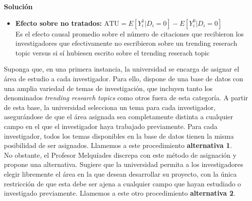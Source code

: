 \documentclass[a4paper, answers, addpoints, 11pt]{exam}
\newenvironment{solucion}{%
  \begin{mdframed}[
    backgroundcolor=blue!5,    %
    linecolor=blue!50,          %
    linewidth=2pt,              %
    leftmargin=10pt,            %
    rightmargin=10pt,           %
    topline=true,              %
    bottomline=true,            %
    roundcorner=10pt,           %
    innerleftmargin=10pt,       %
    innerrightmargin=10pt,      %
    innerbottommargin=10pt,     %
    innertopmargin=10pt         %
  ]%
  \begin{tcolorbox}[colframe=blue!50!black, colback=blue!50, coltitle=white, sharp corners=all, boxrule=1mm, width=\textwidth, halign=left, valign=center, top=0mm, bottom=0mm, left=0mm, right=0mm] \textbf{Solución} \end{tcolorbox} }{\end{mdframed}}
\begin{document}
\begin{itemize}
\begin{itemize}
\begin{solucion}
\begin{itemize}
    \item \textbf{Efecto sobre no tratados:} \( \text{ATU} = E[Y_i^1 | D_i = 0] - E[Y_i^0 | D_i = 0] \)\\
          Es el efecto causal promedio sobre el número de citaciones que recibieron los investigadores que efectivamente no escribieron sobre un trending reserach topic versus  si sí hubiesen escrito sobre el trending reserach topic 
\end{itemize}

        \end{solucion}
    \end{itemize}

\end{itemize}
\bigskip

Suponga que, en una primera instancia, la universidad se encarga de asignar el área de estudio a cada investigador. Para ello, dispone de una base de datos con una amplia variedad de temas de investigación, que incluyen tanto los denominados \textit{trending research topics} como otros fuera de esta categoría. A partir de esta base, la universidad selecciona un tema para cada investigador, asegurándose de que el área asignada sea completamente distinta a cualquier campo en el que el investigador haya trabajado previamente. Para cada investigador, todos los temas disponibles en la base de datos tienen la misma posibilidad de ser asignados. Llamemos a este procedimiento \textbf{alternativa 1}. \\

No obstante, el Profesor Melquíades discrepa con este método de asignación y propone una alternativa. Sugiere que la universidad permita a los investigadores elegir libremente el área en la que desean desarrollar su proyecto, con la única restricción de que esta debe ser ajena a cualquier campo que hayan estudiado o investigado previamente. Llamemos a este otro procedimiento \textbf{alternativa 2}.
\end{document}
